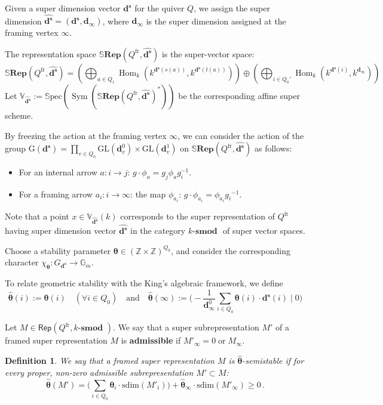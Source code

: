 \documentclass[12pt, reqno]{amsart}
\theoremstyle{plain}
\newtheorem{definition}[theorem]{Definition}
\numberwithin{equation}{section}
\def \d{\mathbf{d}}
\def \sd{\mathbf{d^s}}
\def \Z{\mathbb{Z}}
\def \bS{\mathbb{S}}
\def \bfR{\mathbf{Rep}}
\def \btheta{\boldsymbol{\theta}}
\newcommand{\Hom}{\operatorname{Hom}\nolimits}
\newcommand{\Sym}{\operatorname{Sym}\nolimits}
\newcommand{\sdim}{\mathrm{sdim}}
\newcommand{\smod} {k\text{-}\textbf{smod }}
\newcommand{\Spec}[1]{\mathbb{S}\mathrm{pec}(#1)}
\begin{document}
Given a super dimension vector $\sd$ for the quiver $Q$, we assign the super dimension $\hat{\sd} = (\sd, \d_\infty)$, where $\d_\infty$ is the super dimension assigned at the framing vertex $\infty$. 

The representation space $\bS\bfR(Q^{\mathrm{fr}}, \hat{\sd})$ is the super-vector space:
\[
\bS\bfR(Q^{\mathrm{fr}}, \hat{\sd}) = \left( \bigoplus_{a \in Q_1} \Hom_{k}(k^{\sd(s(a))}, k^{\sd(t(a))}) \right) \oplus \left( \bigoplus_{i \in Q_0'
} \Hom_{k}(k^{\sd(i)}, k^{\d_\infty}) \right)
\]
Let $\mathbb{V}_{\hat{\sd}}:= \Spec{\Sym(\bS\bfR(Q^{\mathrm{fr}}, \hat{\sd})^*)}$ be the corresponding affine super scheme.

By freezing the action at the framing vertex $\infty$, we can consider the action of the group 
$
\mathrm{G}(\sd) = \prod_{v\in Q_0} \mathrm{GL}(\d_v^0) \times \mathrm{GL}(\d_v^1)
$
on $\bS\bfR(Q^{\mathrm{fr}}, \hat{\sd})$ as follows:
\begin{itemize}
    \item For an internal arrow $a: i \to j$: $g \cdot \phi_a = g_j \phi_a g_i^{-1}$.
    \item For a framing arrow $a_i: i \to \infty $: the map $\phi_{a_i}$: $g \cdot \phi_{a_i} = \phi_{a_i}{g_i}^{-1}$.
\end{itemize}

Note that a point $x\in \mathbb{V}_{\hat{\sd}}(k)$ corresponds to the super representation of $Q^{\mathrm{fr}}$ having super dimension vector $\hat{\sd}$ in the category $\smod$ of super vector spaces.

Choose a stability parameter $\btheta \in (\Z\times \Z)^{Q_0}$, and consider the corresponding character $\chi_{\btheta} \colon G_{\sd} \to \mathbb{G}_m$.

To relate geometric stability with the King's algebraic framework, we define
\[
\hat{\btheta}(i) := \btheta(i) \quad (\forall i \in Q_0) \quad \text{and} \quad \hat{\btheta}(\infty) := \Big(-\frac{1}{\d_\infty^0}\sum_{i \in Q_0} \btheta(i) \cdot \sd(i) \;|\; 0\Big)
\]

Let $M\in \mathsf{Rep}(Q^{\mathrm{fr}}, \smod)$. We say that a super subrepresentation $M'$ of a framed super representation $M$ is \textbf{admissible} if $M'_\infty = 0\; \mathrm{or}\; M_\infty$.

\begin{definition}\label{def-frame-stability}
We say that a framed super representation $M$ is $\hat{\btheta}$-semistable if for every proper, non-zero admissible subrepresentation $M' \subset M$:
\[
\hat{\btheta}(M') = \Big( \sum_{i \in Q_0} \btheta_i \cdot \sdim(M'_i)\Big) + \hat{\btheta}_\infty \cdot \sdim(M'_\infty) \ge 0\,.
\]
\end{definition}
\end{document}
